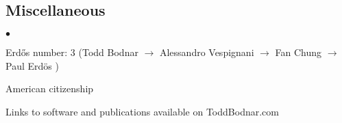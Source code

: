 \documentclass[margin,line]{res}
\newenvironment{list2}{
  \begin{list}{$\bullet$}{%
      \setlength{\itemsep}{0in}
      \setlength{\parsep}{0in} \setlength{\parskip}{0in}
      \setlength{\topsep}{0in} \setlength{\partopsep}{0in} 
      \setlength{\leftmargin}{10pt}}}{\end{list}}
\begin{document}
\begin{resume}
\section{\sc Miscellaneous}
\begin{list2}
\item Erd\H{o}s number: 3 (Todd Bodnar \(\rightarrow\) Alessandro Vespignani \(\rightarrow\) Fan Chung \(\rightarrow\) Paul Erd\"os )
\item American citizenship
\item Links to software and publications available on ToddBodnar.com
\end{list2}


\end{resume}
\end{document}
